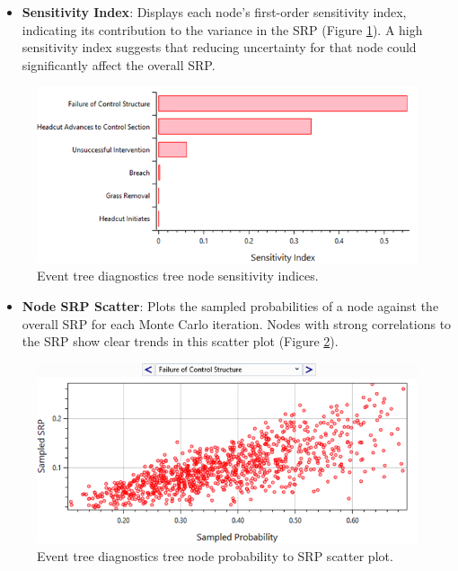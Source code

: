 \documentclass[
]{book}
\providecommand{\tightlist}{%
  \setlength{\itemsep}{0pt}\setlength{\parskip}{0pt}}
\begin{document}
\begin{itemize}
\tightlist
\item
  \textbf{Sensitivity Index}: Displays each node's first-order sensitivity index, indicating its contribution to the variance in the SRP (Figure \ref{fig:figure-96}). A high sensitivity index suggests that reducing uncertainty for that node could significantly affect the overall SRP.
\end{itemize}

\begin{figure}

{\centering \includegraphics{images/figure96} 

}

\caption{Event tree diagnostics tree node sensitivity indices.}\label{fig:figure-96}
\end{figure}

\begin{itemize}
\tightlist
\item
  \textbf{Node SRP Scatter}: Plots the sampled probabilities of a node against the overall SRP for each Monte Carlo iteration. Nodes with strong correlations to the SRP show clear trends in this scatter plot (Figure \ref{fig:figure-97}).
\end{itemize}

\begin{figure}

{\centering \includegraphics{images/figure97} 

}

\caption{Event tree diagnostics tree node probability to SRP scatter plot.}\label{fig:figure-97}
\end{figure}
\end{document}
